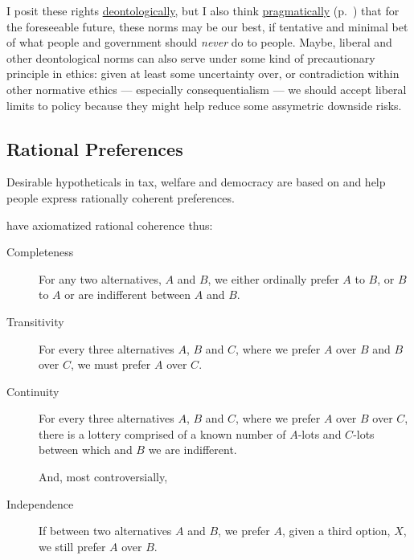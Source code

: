 I posit these rights \hyperref[sec:deontological]{deontologically}, but I also think \hyperref[itm:pragmatic-ethics]{pragmatically} (p.~\pageref{itm:pragmatic-ethics}) that for the foreseeable future, these norms may be our best, if tentative and minimal bet of what people and government should \emph{never} do to people.
Maybe, liberal and other deontological norms can also serve under some kind of precautionary principle in ethics:
given at least some uncertainty over, or contradiction within other normative ethics --- especially consequentialism --- we should accept liberal limits to policy because they might help reduce some assymetric downside risks.

\subsection[Rational]{Rational Preferences}
	\label{sec:rational}
Desirable hypotheticals in tax, welfare and democracy are based on and help people express rationally coherent preferences.

\cite{VonNeumannMorgenstern1944} have axiomatized rational coherence thus:
\begin{description}
	\item[Completeness]
		\label{itm:completeness}
	For any two alternatives, $A$ and $B$, we either ordinally prefer $A$ to $B$, or $B$ to $A$ or are indifferent between $A$ and $B$.

	\item[Transitivity]
		\label{itm:transitivity}
	For every three alternatives $A$, $B$ and $C$, where we prefer $A$ over $B$ and $B$ over $C$, we must prefer $A$ over $C$.

	\item[Continuity]
		\label{itm:continuity}
	For every three alternatives	$A$, $B$ and $C$, where we prefer $A$ over $B$ over $C$, there is a lottery comprised of a known number of $A$-lots and $C$-lots between which and $B$ we are indifferent.

	And, most controversially,

	\item[Independence]
		\label{itm:independence}
	If between two alternatives $A$ and $B$, we prefer $A$, given a third option, $X$, we still prefer $A$ over $B$.
\end{description}

